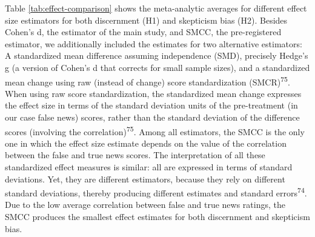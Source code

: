 \documentclass[
  man]{apa6}
\begin{document}
Table \ref{tab:effect-comparison} shows the meta-analytic averages for different effect size estimators for both discernment (H1) and skepticism bias (H2). Besides Cohen's d, the estimator of the main study, and SMCC, the pre-registered estimator, we additionally included the estimates for two alternative estimators: A standardized mean difference assuming independence (SMD), precisely Hedge's g (a version of Cohen's d that corrects for small sample sizes), and a standardized mean change using raw (instead of change) score standardization (SMCR)\textsuperscript{75}. When using raw score standardization, the standardized mean change expresses the effect size in terms of the standard deviation units of the pre-treatment (in our case false news) scores, rather than the standard deviation of the difference scores (involving the correlation)\textsuperscript{75}. Among all estimators, the SMCC is the only one in which the effect size estimate depends on the value of the correlation between the false and true news scores. The interpretation of all these standardized effect measures is similar: all are expressed in terms of standard deviations. Yet, they are different estimators, because they rely on different standard deviations, thereby producing different estimates and standard errors\textsuperscript{74}. Due to the low average correlation between false and true news ratings, the SMCC produces the smallest effect estimates for both discernment and skepticism bias.
\end{document}
